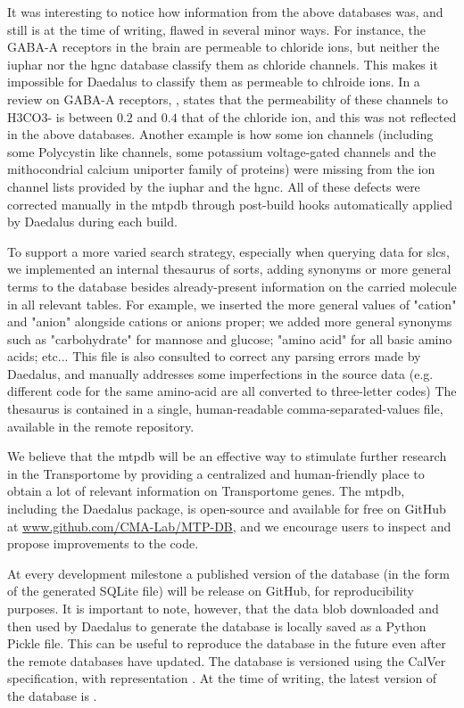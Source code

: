It was interesting to notice how information from the above databases was, and still is at the time of writing, flawed in several minor ways. For instance, the GABA-A receptors in the brain are permeable to chloride ions, but neither the \gls{iuphar} nor the \gls{hgnc} database classify them as chloride channels. This makes it impossible for Daedalus to classify them as permeable to chlroide ions.
In a review on GABA-A receptors, \textcite{goetzGABAAReceptors2007}, states that the permeability of these channels to H3CO3- is between $0.2$ and $0.4$ that of the chloride ion, and this was not reflected in the above databases. 
Another example is how some ion channels (including some Polycystin like channels, some potassium voltage-gated channels and the mithocondrial calcium uniporter family of proteins) were missing from the ion channel lists provided by the \gls{iuphar} and the \gls{hgnc}.
All of these defects were corrected manually in the \gls{mtpdb} through post-build hooks automatically applied by Daedalus during each build.

To support a more varied search strategy, especially when querying data for \glspl{slc}, we implemented an internal thesaurus of sorts, adding synonyms or more general terms to the database besides already-present information on the carried molecule in all relevant tables. For example, we inserted the more general values of "cation" and "anion" alongside cations or anions proper; we added more general synonyms such as "carbohydrate" for mannose and glucose; "amino acid" for all basic amino acids; etc...
This file is also consulted to correct any parsing errors made by Daedalus, and manually addresses some imperfections in the source data (e.g. different code for the same amino-acid are all converted to three-letter codes)
The thesaurus is contained in a single, human-readable comma-separated-values file, available in the remote repository.

We believe that the \gls{mtpdb} will be an effective way to stimulate further research in the Transportome by providing a centralized and human-friendly place to obtain a lot of relevant information on Transportome genes. The \gls{mtpdb}, including the Daedalus package, is open-source and available for free on GitHub at \href{https://github.com/CMA-Lab/MTP-DB/}{www.github.com/CMA-Lab/MTP-DB}, and we encourage users to inspect and propose improvements to the code.

At every development milestone a published version of the database (in the form of the generated SQLite file) will be release on GitHub, for reproducibility purposes. It is important to note, however, that the data blob downloaded and then used by Daedalus to generate the database is locally saved as a Python Pickle file. This can be useful to reproduce the database in the future even after the remote databases have updated. The database is versioned using the CalVer specification, with representation . At the time of writing, the latest version of the database is .

